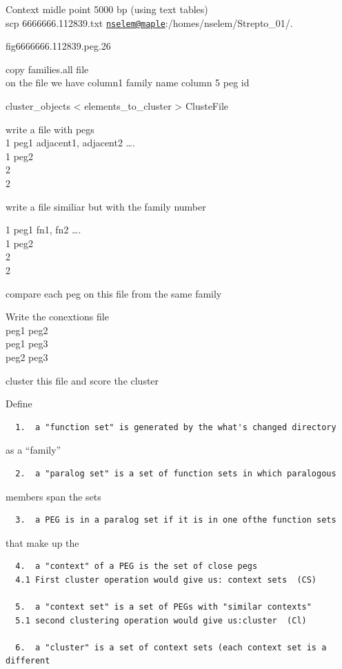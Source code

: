\documentclass[12pt,twoside]{reedthesis}
\begin{document}
  Context midle point 5000 bp (using text tables)\\
  scp 6666666.112839.txt
  \href{mailto:nselem@maple}{\nolinkurl{nselem@maple}}:/homes/nselem/Strepto\_01/.
  
  fig\textbar{}6666666.112839.peg.26
  
  copy families.all file\\
  on the file we have column1 family name column 5 peg id
  
  cluster\_objects \textless{} elements\_to\_cluster \textgreater{}
  ClusteFile
  
  write a file with pegs\\
  1 peg1 adjacent1, adjacent2 \ldots{}.\\
  1 peg2\\
  2\\
  2
  
  write a file similiar but with the family number
  
  1 peg1 fn1, fn2 \ldots{}.\\
  1 peg2\\
  2\\
  2
  
  compare each peg on this file from the same family
  
  Write the conextions file\\
  peg1 peg2\\
  peg1 peg3\\
  peg2 peg3
  
  cluster this file and score the cluster
  
  Define
  
  \begin{verbatim}
  1.  a "function set" is generated by the what's changed directory  
  \end{verbatim}
  
  as a ``family''
  
  \begin{verbatim}
  2.  a "paralog set" is a set of function sets in which paralogous  
  \end{verbatim}
  
  members span the sets
  
  \begin{verbatim}
  3.  a PEG is in a paralog set if it is in one ofthe function sets  
  \end{verbatim}
  
  that make up the
  
  \begin{verbatim}
  4.  a "context" of a PEG is the set of close pegs  
  4.1 First cluster operation would give us: context sets  (CS)  
  
  5.  a "context set" is a set of PEGs with "similar contexts"  
  5.1 second clustering operation would give us:cluster  (Cl)  
  
  6.  a "cluster" is a set of context sets (each context set is a different   
  \end{verbatim}
  
\end{document}
